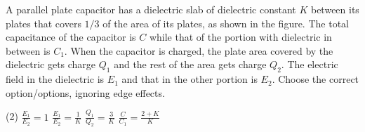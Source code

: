 
\item A parallel plate capacitor has a dielectric slab of dielectric constant \(K\) between its plates that covers \(1/3\) of the area of its plates, as shown in the figure. The total capacitance of the capacitor is \(C\) while that of the portion with dielectric in between is \(C_1\). When the capacitor is charged, the plate area covered by the dielectric gets charge \(Q_1\) and the rest of the area gets charge \(Q_2\). The electric field in the dielectric is \(E_1\) and that in the other portion is \(E_2\). Choose the correct option/options, ignoring edge effects.
    \begin{center}
    \end{center}
    \begin{tasks}(2)
        \task \(\frac{E_1}{E_2} = 1\)
        \task \(\frac{E_1}{E_2} = \frac{1}{K}\)
        \task \(\frac{Q_1}{Q_2} = \frac{3}{K}\)
        \task \(\frac{C}{C_1} = \frac{2+K}{K}\)
    \end{tasks}
